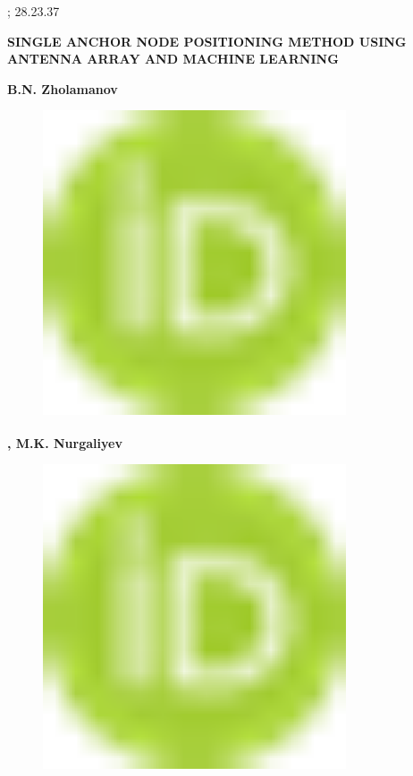 ; 28.23.37

{\bfseries SINGLE ANCHOR NODE POSITIONING METHOD USING ANTENNA ARRAY AND
MACHINE LEARNING}

{\bfseries B.N.
Zholamanov}
\begin{figure}[H]
	\centering
	\includegraphics[width=0.8\textwidth]{media/ict/image16}
	\caption*{}
\end{figure}
{\bfseries \textsuperscript{\envelope }
, M.K.
Nurgaliyev}
\begin{figure}[H]
	\centering
	\includegraphics[width=0.8\textwidth]{media/ict/image16}
	\caption*{}
\end{figure}

